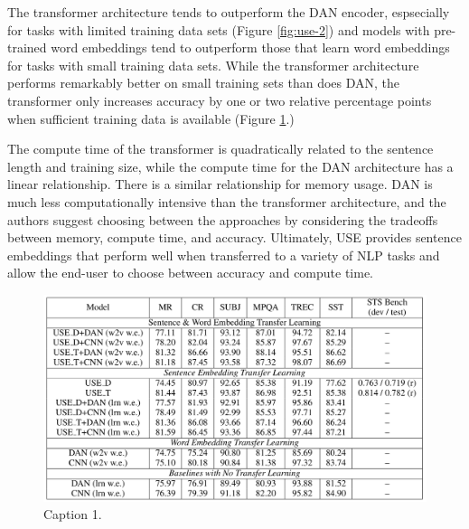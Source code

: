 The transformer architecture tends to outperform the DAN encoder, espsecially for tasks with limited training data sets (Figure \ref{fig:use-2}) and models with pre-trained word embeddings tend to outperform those that learn word embeddings for tasks with small training data sets. While the transformer architecture performs remarkably better on small training sets than does DAN, the transformer only increases accuracy by one or two relative percentage points when sufficient training data is available (Figure \ref{fig:use-1}.) 

The compute time of the transformer is quadratically related to the sentence length and training size, while the compute time for the DAN architecture has a linear relationship. There is a similar relationship for memory usage. DAN is much less computationally intensive than the transformer architecture, and the authors suggest choosing between the approaches by considering the tradeoffs between memory, compute time, and accuracy. Ultimately, USE provides sentence embeddings that perform well when transferred to a variety of NLP tasks and allow the end-user to choose between accuracy and compute time.

\newpage



\begin{figure}[h!]
\centering
  \includegraphics[width=1\linewidth]{files/use-2.png}
  \caption{Caption 1.}
  \label{fig:use-1}
\end{figure}

